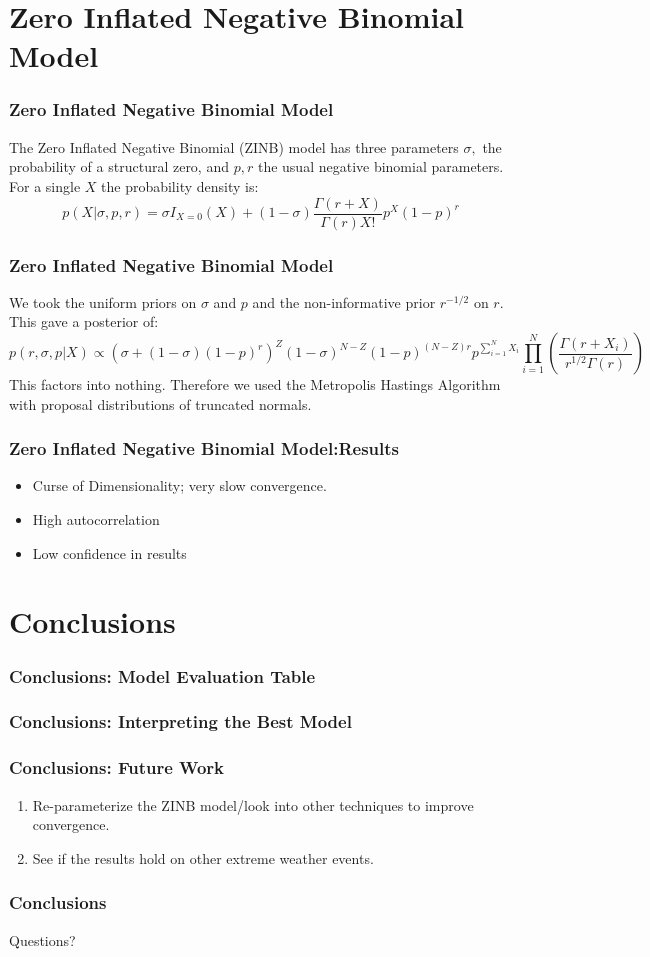 \documentclass{beamer}
\begin{document}
	\section{Zero Inflated Negative Binomial Model}
	\begin{frame}
		\frametitle{Zero Inflated Negative Binomial Model}
		The Zero Inflated Negative Binomial (ZINB) model has three parameters $\sigma,$ the probability of a structural zero, and $p,r$ the usual negative binomial parameters. 
		For a single $X$ the probability density is: 
		$$p(X|\sigma, p, r) = \sigma I_{X=0}(X) + (1-\sigma)\frac{\Gamma(r+X)}{\Gamma(r)X!}p^X(1-p)^r$$
	\end{frame}
	\begin{frame}
		\frametitle{Zero Inflated Negative Binomial Model}
		We took the uniform priors on $\sigma$ and $p$ and the non-informative prior $r^{-1/2}$ on $r$.
		This gave a posterior of:
		\scriptsize$$p(r,\sigma, p|X)\propto\left(\sigma + (1-\sigma)(1-p)^r\right)^Z(1-\sigma)^{N-Z}(1-p)^{(N-Z)r}p^{\sum_{i=1}^NX_i}\prod_{i=1}^N\left(\frac{\Gamma(r+X_i)}{r^{1/2}\Gamma(r)}\right)$$
		\normalsize This factors into nothing. Therefore we used the Metropolis Hastings Algorithm with proposal distributions of truncated normals.
	\end{frame}
	\begin{frame}
		\frametitle{Zero Inflated Negative Binomial Model:Results}
		\begin{itemize}
			\item Curse of Dimensionality; very slow convergence.
			\item High autocorrelation
			\item Low confidence in results
		\end{itemize}
	\end{frame}
	
	\section{Conclusions}
	\begin{frame}
		\frametitle{Conclusions: Model Evaluation Table}
	\end{frame}
	\begin{frame}
		\frametitle{Conclusions: Interpreting the Best Model}
	\end{frame}
	\begin{frame}
		\frametitle{Conclusions: Future Work}
		\begin{enumerate}
			\item{Re-parameterize the ZINB model/look into other techniques to improve convergence.}
			\item{See if the results hold on other extreme weather events.}
		\end{enumerate}
	\end{frame}
	\begin{frame}
		\frametitle{Conclusions}
		Questions?
	\end{frame}
	
\end{document}
